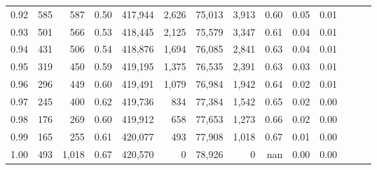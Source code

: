 \begin{tabular}{rrrrrrrrrrrrrr}
0.92 &    585 &    587 &  0.50 &  417,944 &    2,626 &  75,013 &   3,913 &  0.60 &  0.05 &      0.01 \\
0.93 &    501 &    566 &  0.53 &  418,445 &    2,125 &  75,579 &   3,347 &  0.61 &  0.04 &      0.01 \\
0.94 &    431 &    506 &  0.54 &  418,876 &    1,694 &  76,085 &   2,841 &  0.63 &  0.04 &      0.01 \\
0.95 &    319 &    450 &  0.59 &  419,195 &    1,375 &  76,535 &   2,391 &  0.63 &  0.03 &      0.01 \\
0.96 &    296 &    449 &  0.60 &  419,491 &    1,079 &  76,984 &   1,942 &  0.64 &  0.02 &      0.01 \\
0.97 &    245 &    400 &  0.62 &  419,736 &      834 &  77,384 &   1,542 &  0.65 &  0.02 &      0.00 \\
0.98 &    176 &    269 &  0.60 &  419,912 &      658 &  77,653 &   1,273 &  0.66 &  0.02 &      0.00 \\
0.99 &    165 &    255 &  0.61 &  420,077 &      493 &  77,908 &   1,018 &  0.67 &  0.01 &      0.00 \\
1.00 &    493 &  1,018 &  0.67 &  420,570 &        0 &  78,926 &       0 &   nan &  0.00 &      0.00 \\
\bottomrule
\end{tabular}
